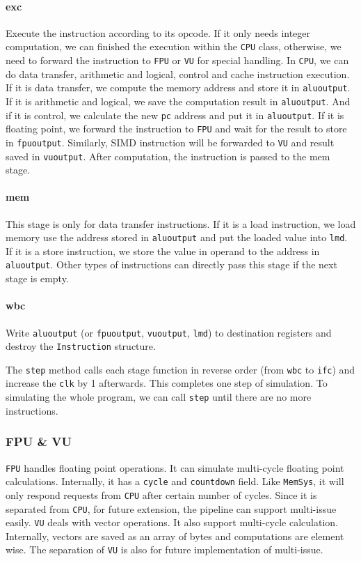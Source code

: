 \documentclass{sig-alternate}
\begin{document}
\paragraph{exc}
Execute the instruction according to its opcode. If it only needs integer computation, we can finished the execution within the \texttt{CPU} class, otherwise, we need to forward the instruction to \texttt{FPU} or \texttt{VU} for special handling. In \texttt{CPU}, we can do data transfer, arithmetic and logical, control and cache instruction execution. If it is data transfer, we compute the memory address and store it in \texttt{aluoutput}. If it is arithmetic and logical, we save the computation result in \texttt{aluoutput}. And if it is control, we calculate the new \texttt{pc} address and put it in \texttt{aluoutput}. If it is floating point, we forward the instruction to \texttt{FPU} and wait for the result to store in \texttt{fpuoutput}. Similarly, SIMD instruction will be forwarded to \texttt{VU} and result saved in \texttt{vuoutput}. After computation, the instruction is passed to the mem stage.

\paragraph{mem}
This stage is only for data transfer instructions. If it is a load instruction, we load memory use the address stored in \texttt{aluoutput} and put the loaded value into \texttt{lmd}. If it is a store instruction, we store the value in operand to the address in \texttt{aluoutput}. Other types of instructions can directly pass this stage if the next stage is empty.

\paragraph{wbc}
Write \texttt{aluoutput} (or \texttt{fpuoutput}, \texttt{vuoutput}, \texttt{lmd}) to destination registers and destroy the \texttt{Instruction} structure.

The \texttt{step} method calls each stage function in reverse order (from \texttt{wbc} to \texttt{ifc}) and increase the \texttt{clk} by 1 afterwards. This completes one step of simulation. To simulating the whole program, we can call \texttt{step} until there are no more instructions. 


\subsubsection{FPU \& VU}
\texttt{FPU} handles floating point operations. It can simulate multi-cycle floating point calculations. Internally, it has a \texttt{cycle} and \texttt{countdown} field. Like \texttt{MemSys}, it will only respond requests from \texttt{CPU} after certain number of cycles. Since it is separated from \texttt{CPU}, for future extension, the pipeline can support multi-issue easily. \texttt{VU} deals with vector operations. It also support multi-cycle calculation. Internally, vectors are saved as an array of bytes and computations are element wise. The separation of \texttt{VU} is also for future implementation of multi-issue.
\end{document}

